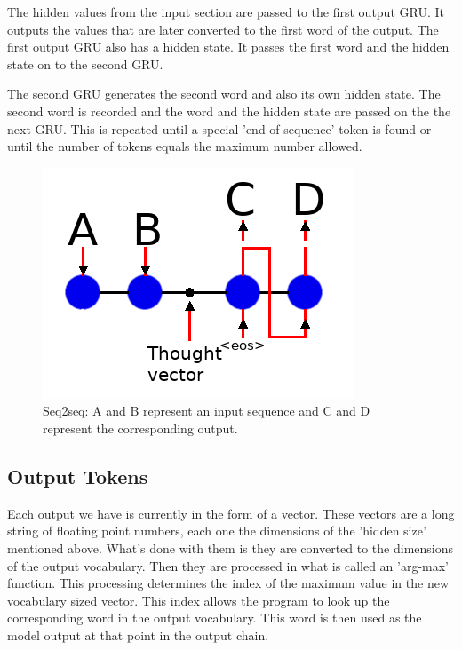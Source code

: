 The hidden values from the input section are passed to the first output GRU. It outputs the values that are later converted to the first word of the output. The first output GRU also has a hidden state. It passes the first word and the hidden state on to the second GRU.

The second GRU generates the second word and also its own hidden state. The second word is recorded and the word and the hidden state are passed on the the next GRU. This is repeated until a special 'end-of-sequence' token is found or until the number of tokens equals the maximum number allowed.

\begin{figure}[H]
	
	\includegraphics[scale=1.0]{diagram-nmt}
	
	\caption[Sequence to Sequence]{Seq2seq: A and B represent an input sequence and C and D represent the corresponding output.}
	
\end{figure}

\subsection*{Output Tokens}
Each output we have is currently in the form of a vector. These vectors are a long string of floating point numbers, each one the dimensions of the 'hidden size' mentioned above. What's done with them is they are converted to the dimensions of the output vocabulary. Then they are processed in what is called an 'arg-max' function. This processing determines the index of the maximum value in the new vocabulary sized vector. This index allows the program to look up the corresponding word in the output vocabulary. This word is then used as the model output at that point in the output chain.

